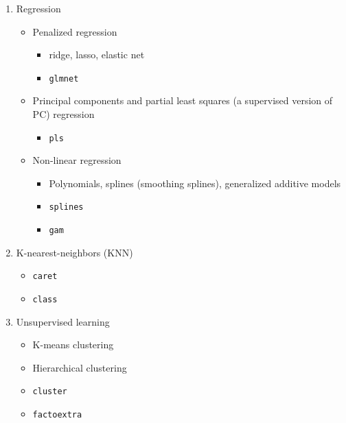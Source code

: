 \documentclass[]{book}
\providecommand{\tightlist}{%
  \setlength{\itemsep}{0pt}\setlength{\parskip}{0pt}}
\begin{document}
\begin{enumerate}
\def\labelenumi{\arabic{enumi}.}
\tightlist
\item
  Regression

  \begin{itemize}
  \tightlist
  \item
    Penalized regression

    \begin{itemize}
    \tightlist
    \item
      ridge, lasso, elastic net
    \item
      \texttt{glmnet}
    \end{itemize}
  \item
    Principal components and partial least squares (a supervised version of PC) regression

    \begin{itemize}
    \tightlist
    \item
      \texttt{pls}
    \end{itemize}
  \item
    Non-linear regression

    \begin{itemize}
    \tightlist
    \item
      Polynomials, splines (smoothing splines), generalized additive models
    \item
      \texttt{splines}
    \item
      \texttt{gam}
    \end{itemize}
  \end{itemize}
\item
  K-nearest-neighbors (KNN)

  \begin{itemize}
  \tightlist
  \item
    \texttt{caret}
  \item
    \texttt{class}
  \end{itemize}
\item
  Unsupervised learning

  \begin{itemize}
  \tightlist
  \item
    K-means clustering
  \item
    Hierarchical clustering
  \item
    \texttt{cluster}
  \item
    \texttt{factoextra}
  \end{itemize}
\end{enumerate}


\end{document}
